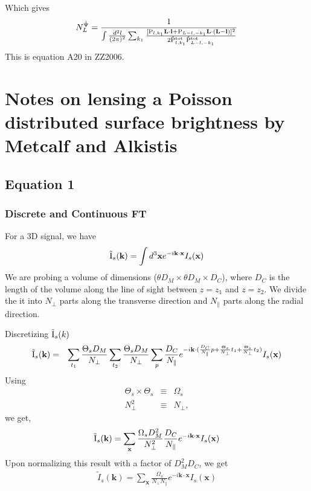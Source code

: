 \documentclass[12pt]{article}
\newcommand{\beq}{\begin{equation}}
\newcommand{\eeq}{\end{equation}}
\newcommand{\beqal}{\begin{aligned}}
\newcommand{\eeqal}{\end{aligned}}
\def\l{{\bf l}}
\def\L{{\bf L}}
\def\il{{\tilde{\rm I}}}
\def\pul{{\rm P}}
\def\ptot{{\tilde{\rm P}^{\rm tot}}}
\numberwithin{equation}{section}
\begin{document}
Which gives
\beq
\beqal
N_L^{\hat{\Psi}} = \frac{1}{{\int \frac{d^2 l}{(2\pi)^2} \sum_{k_1} \frac{[\pul_{l,k_1} \L\cdot \l +
			\pul_{L-l,-k_1} \L\cdot (\L-\l)]^2}{2\ptot_{l,k_1}\ptot_{L-l,-k_1}} }}
\eeqal
\eeq
This is equation A20 in ZZ2006.


\section{Notes on lensing a Poisson distributed surface brightness by Metcalf and Alkistis}
\subsection{Equation 1}
\subsubsection{Discrete and Continuous FT}
For a 3D signal, we have 
\begin{eqnarray}
	\il_s(\textbf{k}) = \int d^3\textbf{x} e^{-i \textbf{k} \cdot  \textbf{x}} I_s(\textbf{x})
\end{eqnarray}
We are probing a volume of dimensions ($ \theta D_M \times \theta D_M \times D_C $), where $ D_C $ is the length of the volume along the line of sight between $ z = z_1$ and $z = z_2 $.  We divide the it into $ N_\perp $ parts along the transverse direction and $ N_\parallel $ parts along the radial direction. 

Discretizing $ \il_s(k) $ 
\begin{eqnarray}
	\il_s(\textbf {k}) &=& \sum_{t_1} \frac{\Theta_s D_M}{N_\perp} \sum_{t_2} \frac{\Theta_s D_M }{N_\perp} \sum_{p} \frac{D_C}{N_\parallel} e^{-i \textbf {k} \cdot ( \frac{D_C}{N_\parallel}p + \frac{\Theta_s}{N_\perp} t_1 + \frac{\Theta_s}{N_\perp} t_2)} I_s(\textbf {x}) 
\end{eqnarray}
Using
\begin{eqnarray}
	\Theta_s \times \Theta_s &\equiv & \Omega_s \\
	N_\perp^2 &\equiv& N_\perp, 
\end{eqnarray}
we get,
\begin{eqnarray}
	\il_s(\textbf{k}) =  \sum_{\textbf {x}} \frac{\Omega_s D_M^2}{N_\perp^2} \frac{ D_C }{N_\parallel} e^{-i \textbf {k} \cdot \textbf {x}} I_s(\textbf {x})
\end{eqnarray}
Upon normalizing this result with a factor of $ D_M^2 D_C $, we get
\begin{eqnarray}
	\tilde{I}_s(\textbf{k}) =  \sum_{\textbf {x}} \frac{\Omega_s}{N_\perp N_\parallel} e^{-i \textbf {k} \cdot \textbf {x}} I_s(\textbf {x})
\end{eqnarray}
\end{document}
